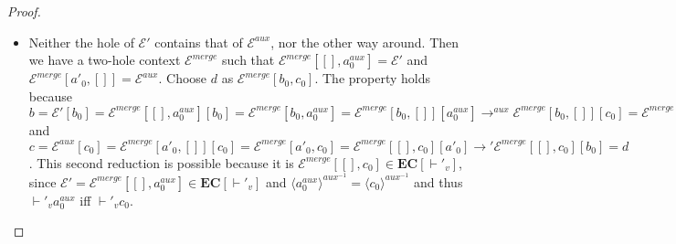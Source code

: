 \begin{proof}
\begin{itemize}
\item Neither the hole of $\mathcal{E}'$ contains that of $\mathcal{E}^{aux}$, nor the other way around. Then we have a two-hole context $\mathcal{E}^{merge}$ such that $\mathcal{E}^{merge}[[], a^{aux}_0] = \mathcal{E}'$ and $\mathcal{E}^{merge}[a'_0, []] = \mathcal{E}^{aux}$. Choose $d$ as $\mathcal{E}^{merge}[b_0, c_0]$. The property holds because $b = \mathcal{E}'[b_0] = \mathcal{E}^{merge}[[], a^{aux}_0][b_0] = \mathcal{E}^{merge}[b_0, a^{aux}_0] = \mathcal{E}^{merge}[b_0, []][a^{aux}_0] \longrightarrow^{aux} \mathcal{E}^{merge}[b_0, []][c_0] = \mathcal{E}^{merge}[b_0, c_0] = d$ and $c = \mathcal{E}^{aux}[c_0] = \mathcal{E}^{merge}[a'_0, []][c_0] = \mathcal{E}^{merge}[a'_0, c_0] = \mathcal{E}^{merge}[[], c_0][a'_0] \longrightarrow' \mathcal{E}^{merge}[[], c_0][b_0] = d$. This second reduction is possible because it is $\mathcal{E}^{merge}[[], c_0] \in \mathbf{EC}[\vdash'_v]$, since $\mathcal{E}' = \mathcal{E}^{merge}[[], a^{aux}_0] \in \mathbf{EC}[\vdash'_v]$ and $\langle a^{aux}_0 \rangle^{aux^{-1}} = \langle c_0 \rangle^{aux^{-1}}$ and thus $\vdash'_v a^{aux}_0$ iff $\vdash'_v c_0$.
\end{itemize}

\end{proof}

